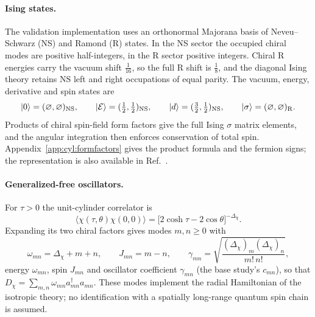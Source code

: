 \documentclass[11pt,a4paper]{article}
\numberwithin{equation}{section}
\newcommand{\ket}[1]{\lvert#1\rangle}
\begin{document}
\paragraph{Ising states.} The validation implementation uses an orthonormal Majorana basis of Neveu--Schwarz (NS) and
Ramond (R) states. In the NS sector the occupied chiral modes are positive half-integers, in the R sector positive
integers. Chiral R energies carry the vacuum shift $\frac1{16}$, so the full R shift is $\frac18$, and the diagonal
Ising theory retains NS left and right occupations of equal parity. The vacuum, energy, derivative and spin states are
\begin{equation}
 \ket0=(\varnothing,\varnothing)_{\rm NS},\qquad \ket{\mathcal E}=(\tfrac12,\tfrac12)_{\rm NS},\qquad
 \ket d=(\tfrac32,\tfrac12)_{\rm NS},\qquad \ket\sigma=(\varnothing,\varnothing)_{\rm R}.
\end{equation}
Products of chiral spin-field form factors give the full Ising $\sigma$ matrix elements, and the angular integration
then enforces conservation of total spin. Appendix~\ref{app:cyl:formfactors} gives the product formula and the fermion
signs; the representation is also available in Ref.~\cite{Liu:2026}.

\paragraph{Generalized-free oscillators.} For $\tau>0$ the unit-cylinder correlator is
\begin{equation}
 \langle\chi(\tau,\theta)\chi(0,0)\rangle=\bigl[2\cosh\tau-2\cos\theta\bigr]^{-\Delta_\chi}.
\end{equation}
Expanding its two chiral factors gives modes $m,n\ge0$ with
\begin{equation}
 \omega_{mn}=\Delta_\chi+m+n,\qquad J_{mn}=m-n,\qquad
 \gamma_{mn}=\sqrt{\frac{(\Delta_\chi)_m(\Delta_\chi)_n}{m!\,n!}},
\end{equation}
energy $\omega_{mn}$, spin $J_{mn}$ and oscillator coefficient $\gamma_{mn}$ (the base study's $c_{mn}$), so that
$D_\chi=\sum_{m,n}\omega_{mn}a^\dagger_{mn}a_{mn}$. These modes implement the radial Hamiltonian of the isotropic theory;
no identification with a spatially long-range quantum spin chain is assumed.

\end{document}
